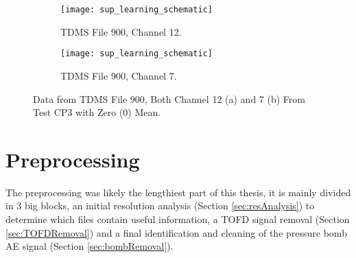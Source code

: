 \begin{table}[H]\label{tab:streaming_data}
	\centering
	\caption{Hydrostatic Test Summary}
\end{table}

\begin{figure}[H]
	\centering
	\begin{subfigure}{.5\textwidth}
		\texttt{[image: sup\_learning\_schematic]}
		\caption{TDMS File 900, Channel 12.}
		\label{fig:tdms_example_a}
	\end{subfigure}%
	\begin{subfigure}{.5\textwidth}
		\texttt{[image: sup\_learning\_schematic]}
		\caption{TDMS File 900, Channel 7.}
		\label{fig:tdms_example_b}
	\end{subfigure}
	\caption{Data from TDMS File 900, Both Channel 12 (a) and 7 (b) From Test CP3 with Zero (0) Mean.}
	\label{fig:tdms_example}
\end{figure}

\section{Preprocessing} \label{sec:preprocessing}
The preprocessing was likely the lengthiest part of this thesis, it is mainly divided in 3 big blocks, an initial resolution analysis (Section \ref{sec:resAnalysis}) to determine which files contain useful information, a TOFD signal removal (Section \ref{sec:TOFDRemoval}) and a final identification and cleaning of the pressure bomb AE signal (Section \ref{sec:bombRemoval}).

